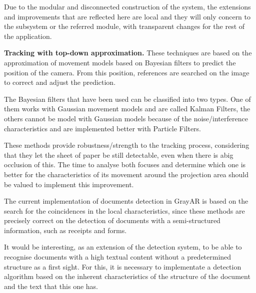 Due to the modular and disconnected construction of the system, the extensions and improvements that are reflected here are local and they will only concern to the subsystem or the referred module, with transparent changes for the
rest of the application.

\begin{description}
\item \textbf{Tracking with top-down approximation. } These techniques are based on the approximation of movement models based on Bayesian filters to predict the position of the camera. From this position, references are searched on the image to correct and adjust the prediction. 

The Bayesian filters that have been used can be classified into two types. One of them works with Gaussian movement models and are called Kalman Filters, the others cannot be model with Gaussian models because of the noise/interference
characteristics and are implemented better with Particle Filters.

These methods provide robustness/strength to the tracking process, considering that they let the sheet of paper be still detectable, even when there is abig occlusion of this. The time to analyse both focuses and determine which one is
better for the characteristics of its movement around the projection area should be valued to implement this improvement.

\item[Document image recognition using LLAH or similar.] %
The current implementation of documents detection in GrayAR is based on the search for the coincidences in the local characteristics, since these methods are precisely correct on the detection of documents with a semi-structured information, such as receipts and forms.

It would be interesting, as an extension of the detection system, to be able to recognise documents with a high textual content without a predetermined structure as a first sight. For this, it is necessary to implementate a detection algorithm based on the inherent characteristics of the structure of the document and the text that this one has.


\end{description}
